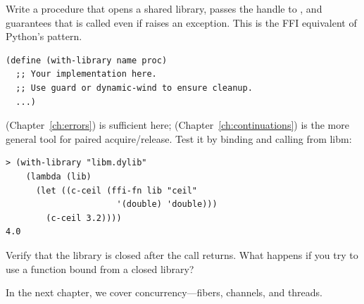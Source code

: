 \begin{exercise}
Write a procedure  that opens a shared library, passes the handle to , and guarantees that  is called even if  raises an exception. This is the FFI equivalent of Python's  pattern.

\begin{lstlisting}
(define (with-library name proc)
  ;; Your implementation here.
  ;; Use guard or dynamic-wind to ensure cleanup.
  ...)
\end{lstlisting}

 (Chapter~\ref{ch:errors}) is sufficient here;  (Chapter~\ref{ch:continuations}) is the more general tool for paired acquire/release. Test it by binding and calling  from libm:

\begin{lstlisting}[style=repl]
> (with-library "libm.dylib"
    (lambda (lib)
      (let ((c-ceil (ffi-fn lib "ceil"
                      '(double) 'double)))
        (c-ceil 3.2))))
4.0
\end{lstlisting}

Verify that the library is closed after the call returns. What happens if you try to use a function bound from a closed library?
\end{exercise}

In the next chapter, we cover concurrency---fibers, channels, and threads.

\chapterend
